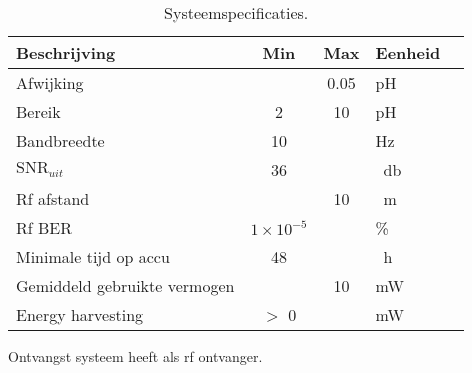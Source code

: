 \begin{table}[ht]
    \centering
    \begin{tabular}{|l|c c|l|c|}
        \hline
        Beschrijving                    & Min               & Max   & Eenheid           \\
        \hline 
        Afwijking                       &                   & 0.05  & pH                \\ 
        Bereik                          & 2                 & 10    & pH                \\
        Bandbreedte                     & 10                &       & Hz                \\
        $\mathrm{SNR}_{uit}$            & 36                &       & \qty{}{\decibel}  \\
        Rf afstand                      &                   & 10    & \qty{}{\meter}    \\
        Rf BER                          & $1\times10^{-5}$  &       & \%                \\
        Minimale tijd op accu           & 48                &       & \qty{}{\hour}     \\
        Gemiddeld gebruikte vermogen    &                   & 10    & mW                \\
        Energy harvesting               & $>$ 0             &       & mW               &\\
        \hline
    \end{tabular}
    \caption{Systeemspecificaties.}
    \label{tab:systemSpecs}
\end{table}

Ontvangst systeem heeft \mcu als rf ontvanger.







